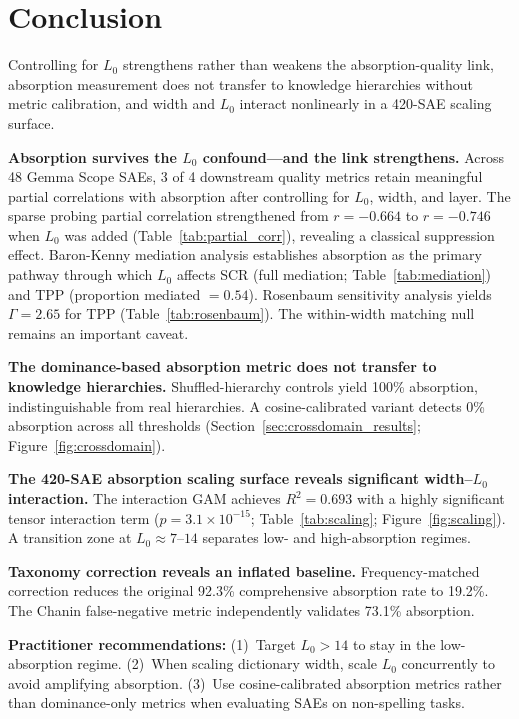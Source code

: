 \documentclass{article}
\begin{document}
\section{Conclusion}
\label{sec:conclusion}

Controlling for $L_0$ strengthens rather than weakens the absorption-quality link, absorption measurement does not transfer to knowledge hierarchies without metric calibration, and width and $L_0$ interact nonlinearly in a 420-SAE scaling surface.

\textbf{Absorption survives the $L_0$ confound---and the link strengthens.}
Across 48 Gemma Scope SAEs, 3 of 4 downstream quality metrics retain meaningful partial correlations with absorption after controlling for $L_0$, width, and layer.
The sparse probing partial correlation strengthened from $r = -0.664$ to $r = -0.746$ when $L_0$ was added (Table~\ref{tab:partial_corr}), revealing a classical suppression effect.
Baron-Kenny mediation analysis establishes absorption as the primary pathway through which $L_0$ affects SCR (full mediation; Table~\ref{tab:mediation}) and TPP (proportion mediated $= 0.54$).
Rosenbaum sensitivity analysis yields $\Gamma = 2.65$ for TPP (Table~\ref{tab:rosenbaum}).
The within-width matching null remains an important caveat.

\textbf{The dominance-based absorption metric does not transfer to knowledge hierarchies.}
Shuffled-hierarchy controls yield 100\% absorption, indistinguishable from real hierarchies.
A cosine-calibrated variant detects 0\% absorption across all thresholds (Section~\ref{sec:crossdomain_results}; Figure~\ref{fig:crossdomain}).

\textbf{The 420-SAE absorption scaling surface reveals significant width--$L_0$ interaction.}
The interaction GAM achieves $R^2 = 0.693$ with a highly significant tensor interaction term ($p = 3.1 \times 10^{-15}$; Table~\ref{tab:scaling}; Figure~\ref{fig:scaling}).
A transition zone at $L_0 \approx 7$--$14$ separates low- and high-absorption regimes.

\textbf{Taxonomy correction reveals an inflated baseline.}
Frequency-matched correction reduces the original 92.3\% comprehensive absorption rate to 19.2\%.
The Chanin false-negative metric independently validates 73.1\% absorption.

\textbf{Practitioner recommendations:}
(1)~Target $L_0 > 14$ to stay in the low-absorption regime.
(2)~When scaling dictionary width, scale $L_0$ concurrently to avoid amplifying absorption.
(3)~Use cosine-calibrated absorption metrics rather than dominance-only metrics when evaluating SAEs on non-spelling tasks.
\end{document}
